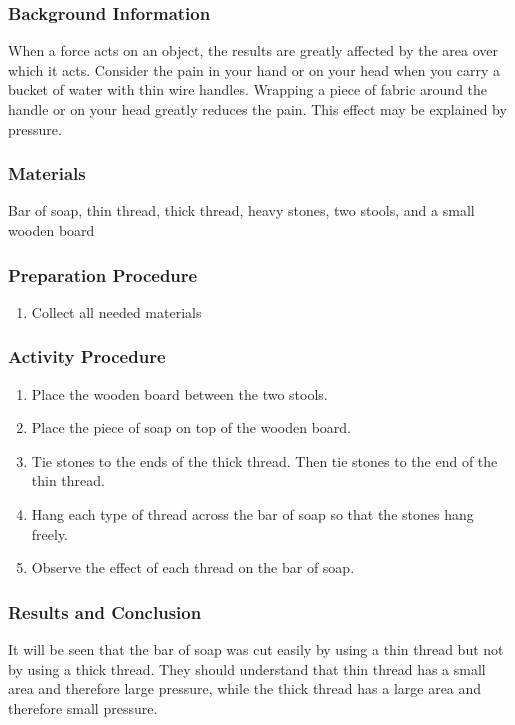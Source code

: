 \subsubsection*{Background Information}
When a force acts on an object, the results are greatly affected by the area over which it acts. Consider the pain in your hand or on your head when you carry a bucket of water with thin wire handles. Wrapping a piece of fabric around the handle or on your head greatly reduces the pain. This effect may be explained by pressure.

\subsubsection*{Materials}
Bar of soap, thin thread, thick thread, heavy stones, two stools, and a small wooden board

\subsubsection*{Preparation Procedure}
\begin{enumerate}
\item{Collect all needed materials}
\end{enumerate}

\subsubsection*{Activity Procedure}
\begin{enumerate}
\item{Place the wooden board between the two stools.}
\item{Place the piece of soap on top of the wooden board. }
\item{Tie stones to the ends of the thick thread. Then tie stones to the end of the thin thread.} 
\item{Hang each type of thread across the bar of soap so that the stones hang freely.} 
\item{Observe the effect of each thread on the bar of soap.} 
\end{enumerate}

\subsubsection*{Results and Conclusion}
It will be seen that the bar of soap was cut easily by using a thin thread but not by using a thick thread. They should understand that thin thread has a small area and therefore large pressure, while the thick thread has a large area and therefore small pressure. 

